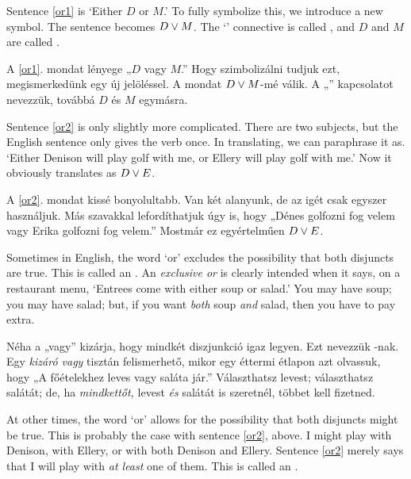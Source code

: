 Sentence \ref{or1} is `Either $D$ or $M$.' To fully symbolize this, we introduce a new symbol. The sentence becomes $D \vee M$. The `\eor' connective is called , and $D$ and $M$ are called .

A \ref{or1}. mondat lényege „$D$ vagy $M$.” Hogy szimbolizálni tudjuk ezt, megismerkedünk egy új jelöléssel. A mondat $D \vee M$-mé válik. A „\eor” kapcsolatot  nevezzük, továbbá $D$ és $M$  egymásra.

Sentence \ref{or2} is only slightly more complicated. There are two subjects, but the English sentence only gives the verb once. In translating, we can paraphrase it as. `Either Denison will play golf with me, or Ellery will play golf with me.' Now it obviously translates as $D \vee E$.

A \ref{or2}. mondat kissé bonyolultabb. Van két alanyunk, de az igét csak egyszer használjuk. Más szavakkal lefordíthatjuk úgy is, hogy „Dénes golfozni fog velem vagy Erika golfozni fog velem.” Mostmár ez egyértelműen $D \vee E$.



Sometimes in English, the word `or' excludes the possibility that both disjuncts are true. This is called an .  An \emph{exclusive or} is clearly intended when it says, on a restaurant menu, `Entrees come with either soup or salad.' You may have soup; you may have salad; but, if you want \emph{both} soup \emph{and} salad, then you have to pay extra.

Néha a „vagy” kizárja, hogy mindkét diszjunkció igaz legyen. Ezt nevezzük -nak. Egy \emph{kizáró vagy} tisztán felismerhető, mikor egy éttermi étlapon azt olvassuk, hogy „A főételekhez leves vagy saláta jár.” Választhatsz levest; választhatsz salátát; de, ha \emph{mindkettőt,} levest \emph{és} salátát is szeretnél, többet kell fizetned. 

At other times, the word `or' allows for the possibility that both disjuncts might be true. This is probably the case with sentence \ref{or2}, above. I might play with Denison, with Ellery, or with both Denison and Ellery. Sentence \ref{or2} merely says that I will play with \emph{at least} one of them. This is called an .

